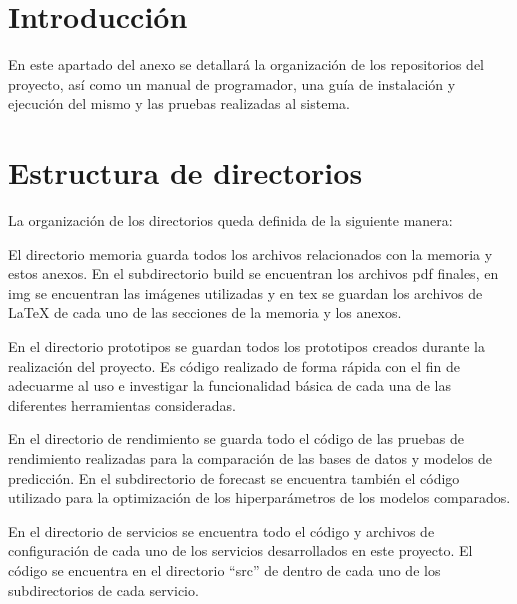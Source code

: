 
\section{Introducción}

En este apartado del anexo se detallará la organización de los repositorios del proyecto, así
como un manual de programador, una guía de instalación y ejecución del mismo y las pruebas realizadas
al sistema.

\section{Estructura de directorios}

La organización de los directorios queda definida de la siguiente manera:


El directorio memoria guarda todos los archivos relacionados con la memoria y estos anexos. En 
el subdirectorio build se encuentran los archivos pdf finales, en img se encuentran las imágenes 
utilizadas y en tex se guardan los archivos de LaTeX de cada uno de las secciones de la memoria y 
los anexos.


En el directorio prototipos se guardan todos los prototipos creados durante la realización del 
proyecto. Es código realizado de forma rápida con el fin de adecuarme al uso e investigar la funcionalidad
básica de cada una de las diferentes herramientas consideradas.


En el directorio de rendimiento se guarda todo el código de las pruebas de rendimiento realizadas 
para la comparación de las bases de datos y modelos de predicción. En el subdirectorio de 
forecast se encuentra también el código utilizado para la optimización de los hiperparámetros de 
los modelos comparados.


En el directorio de servicios se encuentra todo el código y archivos de configuración de cada 
uno de los servicios desarrollados en este proyecto. El código se encuentra en el directorio
``src'' de dentro de cada uno de los subdirectorios de cada servicio. 


